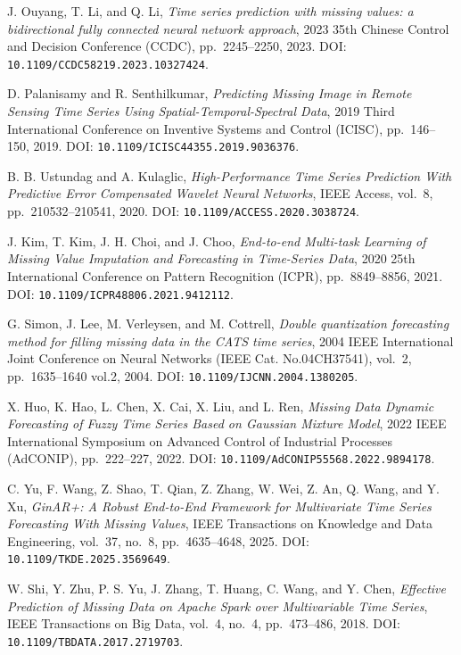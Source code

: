 \begin{enumerate}[label={[S\arabic*]}]
    \item %
    J. Ouyang, T. Li, and Q. Li, \textit{Time series prediction with missing values: a bidirectional fully connected neural network approach}, 2023 35th Chinese Control and Decision Conference (CCDC), pp.~2245–2250, 2023. DOI: \texttt{10.1109/CCDC58219.2023.10327424}.
    \item %
    D. Palanisamy and R. Senthilkumar, \textit{Predicting Missing Image in Remote Sensing Time Series Using Spatial-Temporal-Spectral Data}, 2019 Third International Conference on Inventive Systems and Control (ICISC), pp.~146–150, 2019. DOI: \texttt{10.1109/ICISC44355.2019.9036376}.
    \item %
    B. B. Ustundag and A. Kulaglic, \textit{High-Performance Time Series Prediction With Predictive Error Compensated Wavelet Neural Networks}, IEEE Access, vol.~8, pp.~210532–210541, 2020. DOI: \texttt{10.1109/ACCESS.2020.3038724}.
    \item %
    J. Kim, T. Kim, J. H. Choi, and J. Choo, \textit{End-to-end Multi-task Learning of Missing Value Imputation and Forecasting in Time-Series Data}, 2020 25th International Conference on Pattern Recognition (ICPR), pp.~8849–8856, 2021. DOI: \texttt{10.1109/ICPR48806.2021.9412112}.
    \item %
    G. Simon, J. Lee, M. Verleysen, and M. Cottrell, \textit{Double quantization forecasting method for filling missing data in the CATS time series}, 2004 IEEE International Joint Conference on Neural Networks (IEEE Cat. No.04CH37541), vol.~2, pp.~1635–1640 vol.2, 2004. DOI: \texttt{10.1109/IJCNN.2004.1380205}.
    \item %
    X. Huo, K. Hao, L. Chen, X. Cai, X. Liu, and L. Ren, \textit{Missing Data Dynamic Forecasting of Fuzzy Time Series Based on Gaussian Mixture Model}, 2022 IEEE International Symposium on Advanced Control of Industrial Processes (AdCONIP), pp.~222–227, 2022. DOI: \texttt{10.1109/AdCONIP55568.2022.9894178}.
    \item %
    C. Yu, F. Wang, Z. Shao, T. Qian, Z. Zhang, W. Wei, Z. An, Q. Wang, and Y. Xu, \textit{GinAR+: A Robust End-to-End Framework for Multivariate Time Series Forecasting With Missing Values}, IEEE Transactions on Knowledge and Data Engineering, vol.~37, no.~8, pp.~4635–4648, 2025. DOI: \texttt{10.1109/TKDE.2025.3569649}.
    \item %
    W. Shi, Y. Zhu, P. S. Yu, J. Zhang, T. Huang, C. Wang, and Y. Chen, \textit{Effective Prediction of Missing Data on Apache Spark over Multivariable Time Series}, IEEE Transactions on Big Data, vol.~4, no.~4, pp.~473–486, 2018. DOI: \texttt{10.1109/TBDATA.2017.2719703}.

\end{enumerate}
